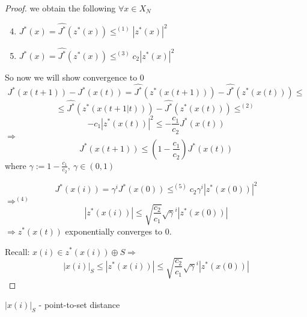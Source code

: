 \begin{Theorem}
\begin{proof}
we obtain the following $\forall x \in X_N$
\begin{enumerate}
\setcounter{enumi}{3}
\item $J^*(x) = \hat{J^*}(z^*(x)) \leq^{(1)} |z^*(x)|^2$
\item $J^*(x) = \hat{J^*}(z^*(x)) \leq^{(3)} c_2|z^*(x)|^2$
\end{enumerate}

So now we will show convergence to $0$
\begin{equation*}
J^*(x(t+1)) - J^*(x(t)) = \hat{J^*}(z^*(x(t+1))) - \hat{J^*}(z^*(x(t))) \leq
\end{equation*}
\begin{equation*}
\leq \hat{J^*}(z^*(x(t+1|t))) - \hat{J^*}(z^*(x(t))) \leq^{(2)}
\end{equation*}
\begin{equation*}
-c_1|z^*(x(t))|^2 \leq - \frac{c_1}{c_2}J^*(x(t))
\end{equation*}
$\Rightarrow$
\begin{equation*}
J^*(x(t+1)) \leq (1 - \frac{c_1}{c_2})J^*(x(t))
\end{equation*} 
where $\gamma := 1 - \frac{c_1}{c_2}, \ \gamma \in (0,1)$

\begin{equation*}
J^*(x(i)) = \gamma^iJ^*(x(0)) \leq^{(5)} c_2\gamma^i|z^*(x(0))|^2
\end{equation*}
$\Rightarrow^{(4)}$
\begin{equation*}
|z^*(x(i))| \leq \sqrt{\frac{c_2}{c_1}}\sqrt{\gamma}^i|z^*(x(0))|
\end{equation*}
$\Rightarrow z^*(x(t))$ exponentially converges to $0$.

Recall: $x(i) \in z^*(x(i)) \oplus S \Rightarrow$
\begin{equation*}
|x(i)|_S \leq |z^*(x(i))| \leq \sqrt{\frac{c_2}{c_1}}\sqrt{\gamma}^i|z^*(x(0))|
\end{equation*}
\end{proof}
\end{Theorem}

$|x(i)|_S$ - point-to-set distance

